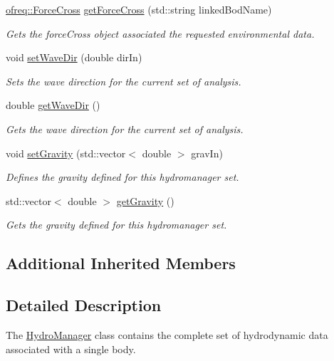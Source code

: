 \begin{DoxyCompactItemize}
\hyperlink{classosea_1_1ofreq_1_1_force_cross}{ofreq\-::\-Force\-Cross} \hyperlink{classosea_1_1ofreq_1_1_hydro_manager_a0c2cf13137035da045963fee200704e6}{get\-Force\-Cross} (std\-::string linked\-Bod\-Name)
\begin{DoxyCompactList}\small\item\em Gets the force\-Cross object associated the requested environmental data. \end{DoxyCompactList}\item 
void \hyperlink{classosea_1_1ofreq_1_1_hydro_manager_ae47c456833341ca95559eb7dd510f608}{set\-Wave\-Dir} (double dir\-In)
\begin{DoxyCompactList}\small\item\em Sets the wave direction for the current set of analysis. \end{DoxyCompactList}\item 
double \hyperlink{classosea_1_1ofreq_1_1_hydro_manager_a6bf3e81ee1d8d100301bfd4415e5b3a1}{get\-Wave\-Dir} ()
\begin{DoxyCompactList}\small\item\em Gets the wave direction for the current set of analysis. \end{DoxyCompactList}\item 
void \hyperlink{classosea_1_1ofreq_1_1_hydro_manager_aacd111b5be95018f7624f664fb599946}{set\-Gravity} (std\-::vector$<$ double $>$ grav\-In)
\begin{DoxyCompactList}\small\item\em Defines the gravity defined for this hydromanager set. \end{DoxyCompactList}\item 
std\-::vector$<$ double $>$ \hyperlink{classosea_1_1ofreq_1_1_hydro_manager_ad24395469371489c07901d7779b635f3}{get\-Gravity} ()
\begin{DoxyCompactList}\small\item\em Gets the gravity defined for this hydromanager set. \end{DoxyCompactList}\end{DoxyCompactItemize}
\subsection*{Additional Inherited Members}


\subsection{Detailed Description}
The \hyperlink{classosea_1_1ofreq_1_1_hydro_manager}{Hydro\-Manager} class contains the complete set of hydrodynamic data associated with a single body. 

